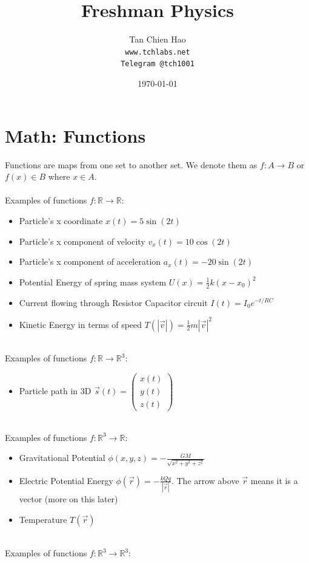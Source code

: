 \documentclass{article}
\title{Freshman Physics}
\author{
    Tan Chien Hao\\
    \texttt{www.tchlabs.net}\\
    \texttt{Telegram @tch1001}
}
\date{\today}
\begin{document}
\maketitle
\tableofcontents

\section{Math: Functions}
Functions are maps from one set to another set. We denote them as $f: A \rightarrow B$ or $f(x) \in B$ where $x\in A$. \\
\\
Examples of functions $f: \mathbb R \to \mathbb R$:
\begin{itemize}
    \item Particle's x coordinate $x(t) = 5 \sin (2t)$
    \item Particle's x component of velocity $v_x(t) = 10 \cos (2t)$
    \item Particle's x component of acceleration $a_x(t) = - 20 \sin (2t)$
    \item Potential Energy of spring mass system $U(x) = \frac{1}{2} k(x-x_0)^2$
    \item Current flowing through Resistor Capacitor circuit $I(t) = I_0 e^{-{t}/{RC}}$
    \item Kinetic Energy in terms of speed $T(|\vec{v}|) = \frac{1}{2} m |\vec{v}|^2$
\end{itemize}
\leavevmode \\
Examples of functions $f: \mathbb R \to \mathbb R^3$:
\begin{itemize}
    \item Particle path in 3D $\vec{s}(t) = \left(\begin{array}{l}
         x(t) \\
         y(t) \\
         z(t) 
    \end{array}\right) $
\end{itemize}
\leavevmode \\
Examples of functions $f: \mathbb R^3 \to \mathbb R$:

\begin{itemize}
    \item Gravitational Potential $\phi(x,y,z) = -\frac{GM}{\sqrt{x^2+y^2+z^2}}$
    \item Electric Potential Energy $\phi(\vec{r}) = -\frac{kQq}{|\vec{r}|}$. The arrow above $\vec{r}$ means it is a vector (more on this later)
    \item Temperature $T(\vec{r})$
\end{itemize}
\leavevmode \\
Examples of functions $f: \mathbb R^3 \to \mathbb R^3$:
\end{document}
